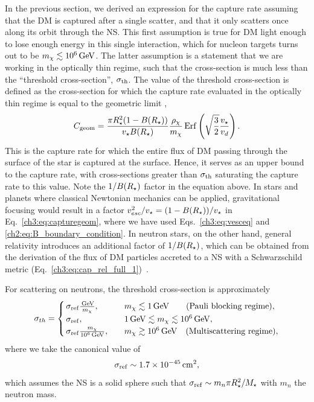 In the previous section, we derived an expression for the capture rate assuming that the DM is captured after a single scatter, and that it only scatters once along its orbit through the NS. This first assumption is true for DM light enough to lose enough energy in this single interaction, which for nucleon targets turns out to be $m_\chi\lesssim 10^6{\rm \,GeV}$. The latter assumption is a statement that we are working in the optically thin regime, such that the cross-section is much less than the ``threshold cross-section'', $\sigma_{\rm th}$. The value of the threshold cross-section is defined as the cross-section for which the capture rate evaluated in the optically thin regime is equal to the geometric limit \cite{Bell:2018pkk_sep_HeatingNeutronStars},  
%
\begin{equation}
C_\mathrm{geom} =  \frac{\pi R_\star^2(1-B(R_\star))}{v_\star B(R_\star)} \frac{\rho_\chi}{m_\chi} {\rm \,Erf}\left(\sqrt{\frac{3}{2}}\frac{v_\star}{v_d}\right).
\label{ch3:eq:capturegeom}
\end{equation}
% 
This is the capture rate for which the entire flux of DM passing through the surface of the star is captured at the surface. Hence, it serves as an upper bound to the capture rate, with cross-sections greater than $\sigma_{\rm th}$ saturating the capture rate to this value.
Note the $1/B(R_\star)$ factor in the equation above. In stars and planets where classical Newtonian mechanics can be applied, gravitational focusing would result in a factor  $v_{esc}^2/v_\star =  (1-B(R_\star))/v_\star$ in Eq.~\ref{ch3:eq:capturegeom}, where we have used Eqs.~\ref{ch3:eq:vesceq} and \ref{ch2:eq:B_boundary_condition}. 
In neutron stars, on the other hand, general relativity introduces an additional factor of $1/B(R_\star)$, which can be obtained from the derivation of the flux of DM particles accreted to a NS with a Schwarzschild metric (Eq.~\ref{ch3:eq:cap_rel_full_1})~\cite{Goldman:1989nd_WeaklyInteractingMassive,Kouvaris:2007ay_WIMPAnnihilationCooling}.

For scattering on neutrons, the threshold cross-section is approximately
\begin{align}
\sigma_{th} =  \begin{cases}
\, \sigma_\mathrm{ref} \frac{{\rm \,GeV}}{m_\chi}, \quad &m_\chi \lesssim 1{\rm \,GeV} \quad \ \ \text{ (Pauli blocking  regime)}, \\
\, \sigma_\mathrm{ref}, \quad &1{\rm \,GeV} \lesssim m_\chi \lesssim 10^6{\rm \,GeV},  \\
\, \sigma_\mathrm{ref} \frac{m_\chi}{10^6{\rm \,GeV}}, \quad &m_\chi\gtrsim 10^6{\rm \,GeV} \quad  \text{(Multiscattering regime)},
\end{cases}
\label{ch3:eq:sigmath}
\end{align}
where we take the canonical value of
\begin{equation}
    \sigma_\mathrm{ref}\sim 1.7 \times 10^{-45}{\rm \,cm}^2,
\end{equation}
which assumes the NS is a solid sphere such that $\sigma_\mathrm{ref}\sim m_n \pi R_\star^2/M_\star$ with $m_n$ the neutron mass.

